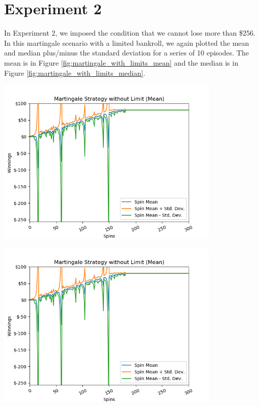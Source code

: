 \documentclass[
	letterpaper, %
]{jdf}
\begin{document}
\section{Experiment 2}
In Experiment 2, we imposed the condition that we cannot lose more than \$256. In this martingale scenario with a limited bankroll, we again plotted the mean and median
plus/minus the standard deviation for a series of 10 episodes. The mean is in Figure \ref{fig:martingale_with_limits_mean} and the median is in Figure
\ref{fig:martingale_with_limits_median}.
\begin{jdffigure}
\includegraphics[height=8cm]{../../martingale/martingale_no_limits_mean.png}
\label{fig:martingale_with_limits_mean}
\end{jdffigure}

\begin{jdffigure}
\includegraphics[height=8cm]{../../martingale/martingale_no_limits_mean.png}
\label{fig:martingale_with_limits_median}
\end{jdffigure}
\end{document}
